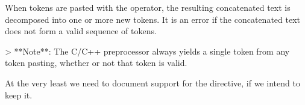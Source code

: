 When tokens are pasted with the \code{##} operator, the resulting concatenated text is decomposed into one or more new tokens.
It is an error if the concatenated text does not form a valid sequence of tokens.

> **Note**: The C/C++ preprocessor always yields a single token from any token pasting, whether or not that token is valid.


\begin{Incomplete}
At the very least we need to document support for the  directive, if we intend to keep it.
\end{Incomplete}

